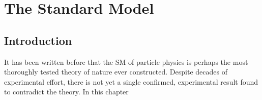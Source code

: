 
\chapter{The Standard Model}
\section{Introduction}
It has been written before that the \acl{SM} of particle physics is perhaps the
most thoroughly tested theory of nature ever constructed. Despite decades of
experimental effort, there is not yet a single confirmed, experimental result
found to contradict the theory. In this chapter
